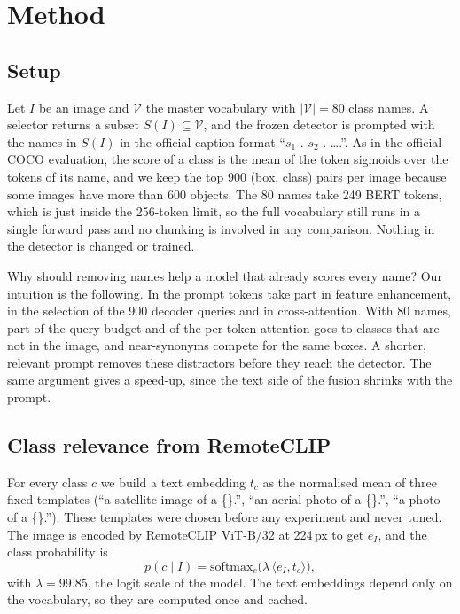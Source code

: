\section{Method}
\label{sec:method}

\subsection{Setup}
Let $I$ be an image and $\mathcal{V}$ the master vocabulary with $|\mathcal{V}|=80$ class names.
A selector returns a subset $S(I)\subseteq\mathcal{V}$, and the frozen detector is prompted with the names in $S(I)$ in the official caption format ``$s_1$ . $s_2$ . \dots .''.
As in the official \gdino COCO evaluation, the score of a class is the mean of the token sigmoids over the tokens of its name, and we keep the top 900 (box, class) pairs per image because some \lae images have more than 600 objects.
The 80 names take 249 BERT tokens, which is just inside the 256-token limit, so the full vocabulary still runs in a single forward pass and no chunking is involved in any comparison.
Nothing in the detector is changed or trained.

Why should removing names help a model that already scores every name? Our intuition is the following.
In \gdino the prompt tokens take part in feature enhancement, in the selection of the 900 decoder queries and in cross-attention.
With 80 names, part of the query budget and of the per-token attention goes to classes that are not in the image, and near-synonyms compete for the same boxes.
A shorter, relevant prompt removes these distractors before they reach the detector.
The same argument gives a speed-up, since the text side of the fusion shrinks with the prompt.

\subsection{Class relevance from RemoteCLIP}
For every class $c$ we build a text embedding $t_c$ as the normalised mean of three fixed templates (``a satellite image of a \{\}.'', ``an aerial photo of a \{\}.'', ``a photo of a \{\}.'').
These templates were chosen before any experiment and never tuned.
The image is encoded by RemoteCLIP ViT-B/32 \cite{liu2024remoteclip} at 224\,px to get $e_I$, and the class probability is
\begin{equation}
  p(c\mid I) = \mathrm{softmax}_c\big(\lambda\,\langle e_I, t_c\rangle\big),
  \label{eq:prob}
\end{equation}
with $\lambda=99.85$, the logit scale of the model.
The text embeddings depend only on the vocabulary, so they are computed once and cached.

